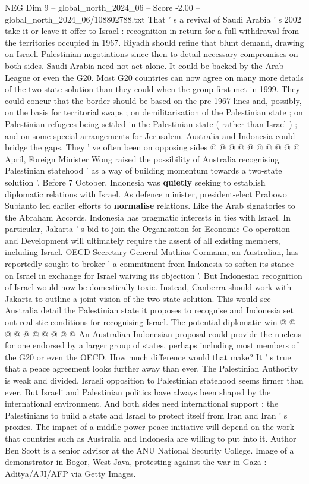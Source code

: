 \begin{textsample}{NEG Dim 9 – global\_north\_2024\_06 – Score -2.00 – global\_north\_2024\_06/108802788.txt}
That ' s a revival of Saudi Arabia ' s 2002 take-it-or-leave-it offer to Israel : recognition in return for a full withdrawal from the territories occupied in 1967.
Riyadh should refine that blunt demand, drawing on Israeli-Palestinian negotiations since then to detail necessary compromises on both sides.
Saudi Arabia need not act alone.
It could be backed by the Arab League or even the G20.
Most G20 countries can now agree on many more details of the two-state solution than they could when the group first met in 1999.
They could concur that the border should be based on the pre-1967 lines and, possibly, on the basis for territorial swaps ; on demilitarisation of the Palestinian state ; on Palestinian refugees being settled in the Palestinian state ( rather than Israel ) ; and on some special arrangements for Jerusalem.
Australia and Indonesia could bridge the gaps.
They ' ve often been on opposing sides @ @ @ @ @ @ @ @ @ @ April, Foreign Minister Wong raised the possibility of Australia recognising Palestinian statehood ' as a way of building momentum towards a two-state solution '.
Before 7 October, Indonesia was \textbf{quietly} seeking to establish diplomatic relations with Israel.
As defence minister, president-elect Prabowo Subianto led earlier efforts to \textbf{normalise} relations.
Like the Arab signatories to the Abraham Accords, Indonesia has pragmatic interests in ties with Israel.
In particular, Jakarta ' s bid to join the Organisation for Economic Co-operation and Development will ultimately require the assent of all existing members, including Israel.
OECD Secretary-General Mathias Cormann, an Australian, has reportedly sought to broker ' a commitment from Indonesia to soften its stance on Israel in exchange for Israel waiving its objection '.
But Indonesian recognition of Israel would now be domestically toxic.
Instead, Canberra should work with Jakarta to outline a joint vision of the two-state solution.
This would see Australia detail the Palestinian state it proposes to recognise and Indonesia set out realistic conditions for recognising Israel.
The potential diplomatic win @ @ @ @ @ @ @ @ @ @ An Australian-Indonesian proposal could provide the nucleus for one endorsed by a larger group of states, perhaps including most members of the G20 or even the OECD.
How much difference would that make?
It ' s true that a peace agreement looks further away than ever.
The Palestinian Authority is weak and divided.
Israeli opposition to Palestinian statehood seems firmer than ever.
But Israeli and Palestinian politics have always been shaped by the international environment.
And both sides need international support : the Palestinians to build a state and Israel to protect itself from Iran and Iran ' s proxies.
The impact of a middle-power peace initiative will depend on the work that countries such as Australia and Indonesia are willing to put into it.
Author Ben Scott is a senior advisor at the ANU National Security College.
Image of a demonstrator in Bogor, West Java, protesting against the war in Gaza : Aditya/AJI/AFP via Getty Images.

\end{textsample}
